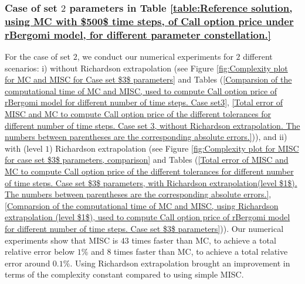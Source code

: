 \FloatBarrier

\subsubsection{Case of set $2$ parameters in Table \ref{table:Reference solution, using MC with $500$ time steps, of Call option price under rBergomi model, for different parameter constellation.}}\label{sec:Case of set 3 parameters}

For the case of set $2$, we conduct our numerical experiments for $2$ different scenarios: i) without Richardson extrapolation (see Figure \ref{fig:Complexity plot for MC and MISC for Case set $3$ parameters} and Tables (\ref{Comparsion of the computational time of  MC and MISC, used to compute Call option price of rBergomi model for different number of time steps. Case set3}, \ref{Total error of MISC and MC to compute Call option price of the different tolerances for different number of time steps. Case set 3, without Richardson extrapolation. The numbers between parentheses are the corresponding absolute errors.})), and  ii) with (level $1$) Richardson extrapolation  (see Figure \ref{fig:Complexity plot for  MISC for case set $3$ parameters, comparison} and Tables (\ref{Total  error of MISC and MC to compute Call option price of the different tolerances for different number of time steps. Case set $3$ parameters, with Richardson extrapolation(level $1$). The numbers between parentheses are the corresponding absolute errors.}, \ref{Comparsion of the computational time of  MC and MISC, using Richardson extrapolation (level $1$), used to compute Call option price of rBergomi model for different number of time steps. Case set $3$ parameters})). Our numerical experiments show that MISC is  $43$ times faster than MC, to achieve  a total relative error below $1\%$ and $8$ times faster than MC, to achieve a total relative error around $0.1\%$. Using Richardson extrapolation brought an improvement in terms of the  complexity constant compared to using simple MISC.


